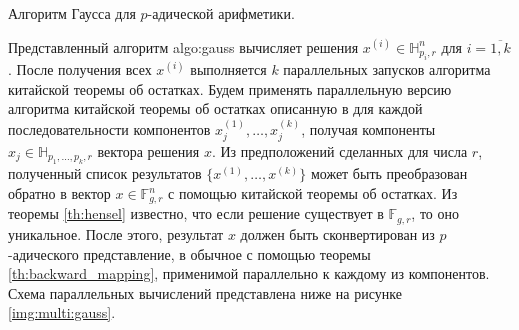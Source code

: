 \documentclass[master, och, diploma, times]{sty/SCWorks}
\theoremstyle{plain}
\theoremstyle{definition}
\begin{document}
\begin{algorithm}
\DontPrintSemicolon %





\caption{Алгоритм Гаусса для $p$-адической арифметики.}
\label{algo:gauss}
\end{algorithm}


Представленный алгоритм {algo:gauss} вычисляет решения $x^{(i)} \in \mathbb{H}_{p_i,r}^n$ для $i = \overline{1,k}$. После получения всех $x^{(i)}$ выполняется $k$ параллельных запусков алгоритма китайской теоремы об остатках. Будем применять параллельную версию алгоритма китайской теоремы об остатках описанную в \cite{bib:numbers:limongelli} для каждой последовательности компонентов $x_j^{(1)}, \dots, x_j^{(k)}$, получая компоненты $x_j \in \mathbb{H}_{p_1,\dots,p_k,r}$ вектора решения $x$.
Из предположений сделанных для числа $r$, полученный список результатов $\{x^{(1)},\dots,x^{(k)}\}$ может быть преобразован обратно в вектор $x \in \mathbb{F}_{g,r}^n$ с помощью китайской теоремы об остатках. Из теоремы \ref{th:hensel} известно, что если решение существует в $\mathbb{F}_{g,r}$, то оно уникальное.
После этого, результат $x$ должен быть сконвертирован из $p$-адического представление, в обычное с помощью теоремы \ref{th:backward_mapping}, применимой параллельно к каждому из компонентов. Схема параллельных вычислений представлена ниже на рисунке \ref{img:multi:gauss}.
\end{document}
